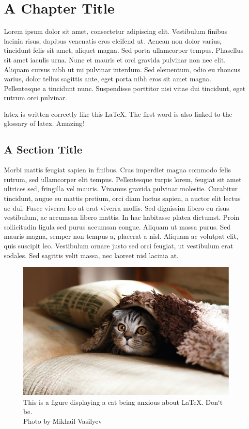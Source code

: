 \chapter{A Chapter Title}

Lorem ipsum dolor sit amet, consectetur adipiscing elit. Vestibulum finibus lacinia risus, dapibus venenatis eros eleifend ut. Aenean non dolor varius, tincidunt felis sit amet, aliquet magna. Sed porta ullamcorper tempus. Phasellus sit amet iaculis urna. Nunc et mauris et orci gravida pulvinar non nec elit. Aliquam cursus nibh ut mi pulvinar interdum. Sed elementum, odio eu rhoncus varius, dolor tellus sagittis ante, eget porta nibh eros sit amet magna. Pellentesque a tincidunt nunc. Suspendisse porttitor nisi vitae dui tincidunt, eget rutrum orci pulvinar.

\bigskip
\gls{latex} is written correctly like this \LaTeX. The first word is also linked to the glossary of \gls{latex}. Amazing!

\clearpage
\section{A Section Title} \label{sec:ch1Section}

Morbi mattis feugiat sapien in finibus. Cras imperdiet magna commodo felis rutrum, sed ullamcorper elit tempus. Pellentesque turpis lorem, feugiat sit amet ultrices sed, fringilla vel mauris. Vivamus gravida pulvinar molestie. Curabitur tincidunt, augue eu mattis pretium, orci diam luctus sapien, a auctor elit lectus ac dui. Fusce viverra leo at erat viverra mollis. Sed dignissim libero eu risus vestibulum, ac accumsan libero mattis. In hac habitasse platea dictumst. Proin sollicitudin ligula sed purus accumsan congue. Aliquam ut massa purus. Sed mauris magna, semper non tempus a, placerat a nisl. Aliquam ac volutpat elit, quis suscipit leo. Vestibulum ornare justo sed orci feugiat, ut vestibulum erat sodales. Sed sagittis velit massa, nec laoreet nisl lacinia at.

\begin{figure}[htp]
  \centering
  \includegraphics[width=\textwidth, keepaspectratio]{images/scaredCat.jpg}
  \caption{This is a figure displaying a cat being anxious about \LaTeX. Don`t be. \\\tiny{Photo by Mikhail Vasilyev}}
  \label{fig:scaredCat}
\end{figure}

